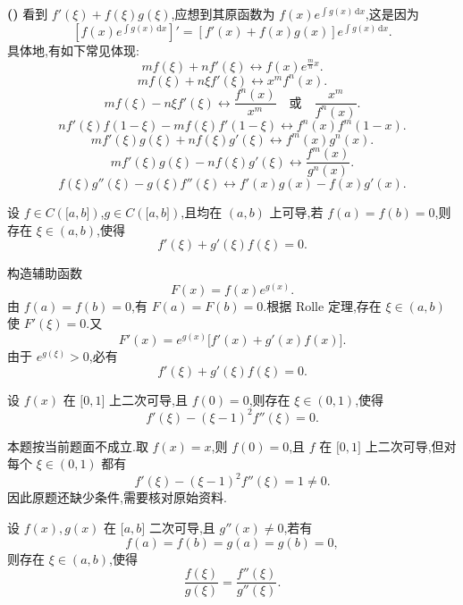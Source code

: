 \noindent\textbf{(\markstar)} 看到 $f'(\xi)+f(\xi)g(\xi)$,应想到其原函数为
$\displaystyle f(x)e^{\int g(x)\,\mathrm{d}x}$,这是因为
\[
    \left[f(x)e^{\int g(x)\,\mathrm{d}x}\right]'
    =[f'(x)+f(x)g(x)]e^{\int g(x)\,\mathrm{d}x}.
\]
具体地,有如下常见体现:
\[
    mf(\xi)+nf'(\xi)
    \longleftrightarrow
    f(x)e^{\frac{m}{n}x}.
\]
\[
    mf(\xi)+n\xi f'(\xi)
    \longleftrightarrow
    x^m f^n(x).
\]
\[
    mf(\xi)-n\xi f'(\xi)
    \longleftrightarrow
    \dfrac{f^n(x)}{x^m}
    \quad\text{或}\quad
    \dfrac{x^m}{f^n(x)}.
\]
\[
    nf'(\xi)f(1-\xi)-mf(\xi)f'(1-\xi)
    \longleftrightarrow
    f^n(x)f^m(1-x).
\]
\[
    mf'(\xi)g(\xi)+nf(\xi)g'(\xi)
    \longleftrightarrow
    f^m(x)g^n(x).
\]
\[
    mf'(\xi)g(\xi)-nf(\xi)g'(\xi)
    \longleftrightarrow
    \dfrac{f^m(x)}{g^n(x)}.
\]
\[
    f(\xi)g''(\xi)-g(\xi)f''(\xi)
    \longleftrightarrow
    f'(x)g(x)-f(x)g'(x).
\]

\begin{example}
    设 $f\in C(\lbrack a,b\rbrack)$,$g\in C(\lbrack a,b\rbrack)$,且均在 $(a,b)$ 上可导,若 $f(a)=f(b)=0$,则存在 $\xi\in(a,b)$,使得
    \[
        f'(\xi)+g'(\xi)f(\xi)=0.
    \]
\end{example}
\exampleblank

\begin{solution}
    构造辅助函数
    \[
        F(x)=f(x)e^{g(x)}.
    \]
    由 $f(a)=f(b)=0$,有 $F(a)=F(b)=0$.根据 Rolle 定理,存在 $\xi\in(a,b)$ 使 $F'(\xi)=0$.又
    \[
        F'(x)=e^{g(x)}\bigl[f'(x)+g'(x)f(x)\bigr].
    \]
    由于 $e^{g(\xi)}>0$,必有
    \[
        f'(\xi)+g'(\xi)f(\xi)=0.
    \]
\end{solution}

\begin{example}
    设 $f(x)$ 在 $\lbrack 0,1\rbrack$ 上二次可导,且 $f(0)=0$,则存在 $\xi\in(0,1)$,使得
    \[
        f'(\xi)-(\xi-1)^2f''(\xi)=0.
    \]
\end{example}
\exampleblank

\begin{solution}
    本题按当前题面不成立.取 $f(x)=x$,则 $f(0)=0$,且 $f$ 在 $\lbrack0,1\rbrack$ 上二次可导,但对每个 $\xi\in(0,1)$ 都有
    \[
        f'(\xi)-(\xi-1)^2f''(\xi)=1\neq0.
    \]
    因此原题还缺少条件,需要核对原始资料.
\end{solution}

\begin{example}
    设 $f(x),g(x)$ 在 $\lbrack a,b\rbrack$ 二次可导,且 $g''(x)\neq0$,若有
    \[
        f(a)=f(b)=g(a)=g(b)=0,
    \]
    则存在 $\xi\in(a,b)$,使得
    \[
        \dfrac{f(\xi)}{g(\xi)}=\dfrac{f''(\xi)}{g''(\xi)}.
    \]
\end{example}
\exampleblank

